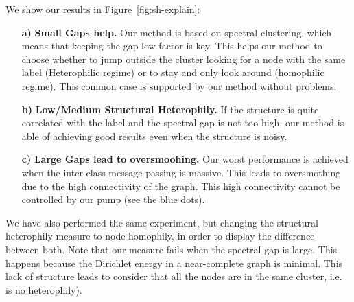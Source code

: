 \documentclass{article}
\theoremstyle{plain}
\theoremstyle{definition}
\begin{document}
We show our results in Figure~\ref{fig:sh-explain}:
\begin{itemize}
    \item[\textbf{a)}] \textbf{Small Gaps help.} Our method is based on spectral clustering, which means that keeping the gap low factor is key. This helps our method to choose whether to jump outside the cluster looking for a node with the same label (Heterophilic regime) or to stay and only look around (homophilic regime). This common case is supported by our method without problems.
\item[\textbf{b)}] \textbf{Low/Medium Structural Heterophily.} If the structure is quite correlated with the label and the spectral gap is not too high, our method is able of achieving good results even when the structure is noisy.
\item[\textbf{c)}]  \textbf{Large Gaps lead to oversmoohing.} Our worst performance is achieved when the inter-class message passing is massive.   This leads to oversmothing due to the high connectivity of the graph. This high connectivity cannot be controlled by our pump (see the blue dots).
\end{itemize}
We have also performed the same experiment, but changing the structural heterophily measure to node homophily, in order to display the difference between both. Note that our measure fails when the spectral gap is large. This happens because the Dirichlet energy in a near-complete graph is minimal. This lack of structure leads  to consider that all the nodes are in the same cluster, i.e. is no heterophily).
\end{document}
